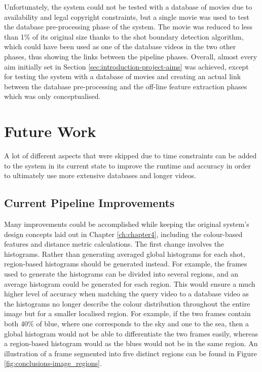 Unfortunately, the system could not be tested with a database of movies due to availability and legal copyright constraints, but a single movie was used to test the database pre-processing phase of the system. The movie was reduced to less than 1\% of its original size thanks to the shot boundary detection algorithm, which could have been used as one of the database videos in the two other phases, thus showing the links between the pipeline phases. Overall, almost every aim initially set in Section \ref{sec:introduction-project-aims} was achieved, except for testing the system with a database of movies and creating an actual link between the database pre-processing and the off-line feature extraction phases which was only conceptualised.
    

\section{Future Work}

A lot of different aspects that were skipped due to time constraints can be added to the system in its current state to improve the runtime and accuracy in order to ultimately use more extensive databases and longer videos.

\subsection{Current Pipeline Improvements}

Many improvements could be accomplished while keeping the original system's design concepts laid out in Chapter \ref{ch:chapter4}, including the colour-based features and distance metric calculations. The first change involves the histograms. Rather than generating averaged global histograms for each shot, region-based histograms should be generated instead. For example, the frames used to generate the histograms can be divided into several regions, and an average histogram could be generated for each region. This would ensure a much higher level of accuracy when matching the query video to a database video as the histograms no longer describe the colour distribution throughout the entire image but for a smaller localised region. For example, if the two frames contain both 40\% of blue, where one corresponds to the sky and one to the sea, then a global histogram would not be able to differentiate the two frames easily, whereas a region-based histogram would as the blues would not be in the same region. An illustration of a frame segmented into five distinct regions can be found in Figure \ref{fig:conclusions-image_regions}.\\

